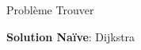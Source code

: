 \begin{frame}
    \frametitle{\problemtitle}
        \begin{block}
            {Problème} Trouver
        \end{block}
        \pause
        \textbf{Solution Naïve}: Dijkstra
\end{frame}